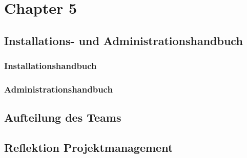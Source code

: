 \chapter{Chapter 5}

\section{Installations- und Administrationshandbuch}

\subsection{Installationshandbuch}

\subsection{Administrationshandbuch}

\section{Aufteilung des Teams}

\section{Reflektion Projektmanagement}